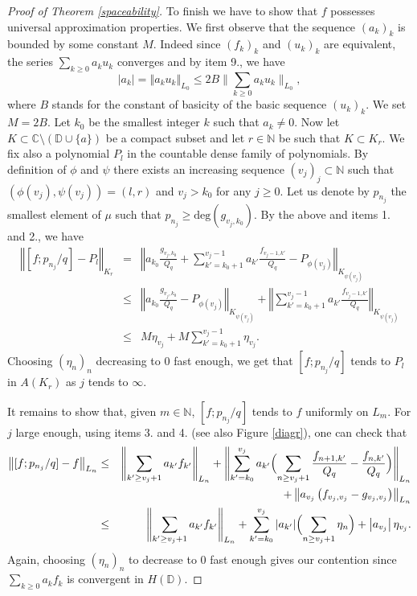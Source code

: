 \documentclass[12pt]{amsart}
\numberwithin{equation}{section}
\begin{document}
\begin{proof}[Proof of Theorem \ref{spaceability}]
To finish we have to show that $f$ possesses universal approximation properties. 
We first observe that the sequence $\left(a_k\right)_k$ is bounded by some constant $M$. Indeed since $\left(f_k\right)_k$ and $\left(u_k\right)_k$ are equivalent, the series $\sum _{k\geq 0}a_ku_k$ converges and by item 9., we have
$$\left\vert a_k\right\vert= \left\Vert a_ku_k\right\Vert _{L_0}\leq 2B\bigg\| \sum _{k\geq 0}a_ku_k\bigg\|_{L_0},$$
where $B$ stands for the constant of basicity of the basic sequence $\left(u_k\right)_k$. We set $M=2B$. Let $k_0$ be the smallest integer $k$ such that $a_k\neq 0$. Now let $K\subset {\mathbb{C}} \setminus ({\mathbb D} \cup \{a\})$ be a compact subset and let $r\in {\mathbb{N}}$ be such that $K\subset K_r$. We fix also a polynomial $P_l$ in the countable dense family of polynomials. By definition of $\phi$ and $\psi$ there exists an increasing sequence $\left(v_j\right)_j\subset {\mathbb{N}}$ such that $\left(\phi(v_j),\psi(v_j)\right)=(l,r)$ and $v_j > k_0$ for any $j\geq 0$. Let us denote by $p_{n_j}$ the smallest element of $\mu$ such that $p_{n_j}\geq \text{deg}\left(g_{v_j,k_0}\right)$. By the above and items 1. and 2., we have
\begin{eqnarray*}\left\Vert [f;p_{n_j}/q]-P_l\right\Vert _{K_r}& = & \left\Vert a_{k_0}\frac{g_{v_j,k_0}}{Q_{q}}+\sum _{k'=k_0+1}^{v_j-1}a_{k'}\frac{f_{v_j-1,k'}}{Q_{q}}-P_{\phi(v_j)}\right\Vert _{K_{\psi(v_j)}}\\
& \leq & \left\Vert a_{k_0}\frac{g_{v_j,k_0}}{Q_{q}}-P_{\phi(v_j)}\right\Vert _{K_{\psi(v_j)}} + \left\Vert\sum _{k'=k_0+1}^{v_j-1}a_{k'}\frac{f_{v_j-1,k'}}{Q_{q}}\right\Vert _{K_{\psi(v_j)}} \\
& \leq & M\eta_{v_j} + M \sum _{k'=k_0+1}^{v_j-1}\eta_{v_j}.
\end{eqnarray*}
Choosing $\left(\eta _n\right)_n$ decreasing to $0$ fast enough, we get that $[f;p_{n_j}/q]$ tends to $P_l$ in $A(K_{r})$ as $j$ tends to $\infty$.

It remains to show that, given $m\in {\mathbb{N}}$, $[f;p_{n_j}/q]$ tends to $f$ uniformly on $L_m$. For $j$ large enough, using items 3. and 4. (see also Figure \ref{diagr}), one can check that
\begin{eqnarray*}\left\| [f;p_{n_j}/q]-f\right\|_{L_n}& \leq & \Biggl\| \sum _{k'\geq v_j+1}a_{k'}f_{k'}\Biggr\|_{L_n} 
+ \Biggl\|\sum _{k'=k_0}^{v_j}a_{k'}\Bigl(\sum _{n\geq v_j+1}\frac{f_{n+1,k'}}{Q_{q}}-\frac{f_{n,k'}}{Q_{q}}\Bigr)\Biggr\|_{L_n} \\
&  & + \left\Vert a_{v_j}\left(f_{v_j,v_j}-g_{v_j,v_j}\right)\right\Vert _{L_n}\\
& \leq & \Biggl\|\sum _{k'\geq v_j+1}a_{k'}f_{k'}\Biggr\|_{L_n} + \sum _{k'=k_0}^{v_j}|a_{k'}|\Bigl(\sum _{n\geq v_j+1}\eta _n\Bigr) + \left\vert a_{v_j}\right\vert \eta _{v_j}.
\end{eqnarray*}
Again, choosing $\left(\eta _n\right)_n$ to decrease to $0$ fast enough gives our contention since $\sum _{k\geq 0}a_{k}f_{k}$ is convergent in $H({\mathbb D})$.
\end{proof}
\end{document}
